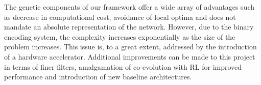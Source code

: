 \documentclass[conference]{IEEEtran}
\begin{document}
The genetic components of our framework offer a wide array of advantages such as decrease in computational cost, avoidance of local optima and does not mandate an absolute representation of the network. However, due to the binary encoding system, the complexity increases exponentially as the size of the problem increases. This issue is, to a great extent, addressed by the introduction of a hardware accelerator. Additional improvements can be made to this project in terms of finer filters, amalgamation of co-evolution with RL for improved performance and introduction of new baseline architectures.  
% 
% 
\end{document}
